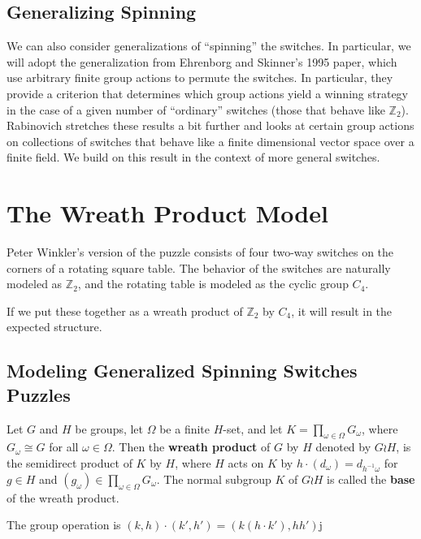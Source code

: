 
\subsection{Generalizing Spinning}
We can also consider generalizations of ``spinning'' the switches.
In particular, we will adopt the generalization from
Ehrenborg and Skinner's \cite{Ehrenborg1995} 1995 paper, which use
arbitrary finite group actions to permute the switches.
In particular, they provide a criterion that determines which group actions
yield a winning strategy in the case of a given number of ``ordinary'' switches
(those that behave like $\mathbb Z_2$).
Rabinovich \cite{Rabinovich2022} stretches these results a bit further and
looks at certain group actions on collections of switches that behave like
a finite dimensional vector space over a finite field. We build on this result
in the context of more general switches.

\section{The Wreath Product Model}
\label{sec:WreathModel}
Peter Winkler's version of the puzzle consists of four two-way switches on the
corners of a rotating square table.
The behavior of the switches are naturally modeled as $\mathbb Z_2$, and
the rotating table is modeled as the cyclic group $C_4$.

If we put these together as a wreath product of $\mathbb Z_2$ by $C_4$, it
will result in the expected structure.
\subsection{Modeling Generalized Spinning Switches Puzzles}
\begin{definition}
  Let $G$ and $H$ be groups,
  let $\Omega$ be a finite $H$-set, and
  let $K = \prod_{\omega \in \Omega} G_\omega$, where $G_\omega \cong G$
  for all $\omega \in \Omega$.
  Then the \textbf{wreath product} of $G$ by $H$ denoted by $G \wr H$,
  is the semidirect product of $K$ by $H$,
  where $H$ acts on $K$ by $h \cdot (d_\omega) = d_{h^{-1}\omega}$ for $g \in H$ and
  $(g_\omega) \in \prod_{\omega \in \Omega} G_\omega$.
  The normal subgroup $K$ of $G \wr H$ is called
  the \textbf{base} of the wreath product.

  The group operation is $(k, h) \cdot (k', h') = (k(h \cdot k'), hh')$j
\end{definition}

